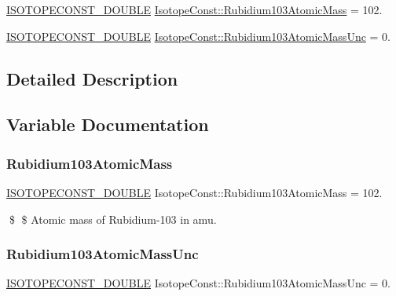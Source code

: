 \begin{DoxyCompactItemize}
\item 
\mbox{\hyperlink{group___isotope_const-_macros_ga8f45a7272ce02c0b4c65c44636ed719a}{I\+S\+O\+T\+O\+P\+E\+C\+O\+N\+S\+T\+\_\+\+D\+O\+U\+B\+LE}} \mbox{\hyperlink{group___isotope_const-_rubidium-_rb103_gae0bac11aa0f8d093a48d11e3522584f3}{Isotope\+Const\+::\+Rubidium103\+Atomic\+Mass}} = 102.
\item 
\mbox{\hyperlink{group___isotope_const-_macros_ga8f45a7272ce02c0b4c65c44636ed719a}{I\+S\+O\+T\+O\+P\+E\+C\+O\+N\+S\+T\+\_\+\+D\+O\+U\+B\+LE}} \mbox{\hyperlink{group___isotope_const-_rubidium-_rb103_ga96df3425521c2b1dcf44f6757ff8c0a2}{Isotope\+Const\+::\+Rubidium103\+Atomic\+Mass\+Unc}} = 0.
\end{DoxyCompactItemize}


\subsection{Detailed Description}


\subsection{Variable Documentation}
\mbox{\label{group___isotope_const-_rubidium-_rb103_gae0bac11aa0f8d093a48d11e3522584f3}} 
\subsubsection{\texorpdfstring{Rubidium103\+Atomic\+Mass}{Rubidium103AtomicMass}}
{\footnotesize\ttfamily \mbox{\hyperlink{group___isotope_const-_macros_ga8f45a7272ce02c0b4c65c44636ed719a}{I\+S\+O\+T\+O\+P\+E\+C\+O\+N\+S\+T\+\_\+\+D\+O\+U\+B\+LE}} Isotope\+Const\+::\+Rubidium103\+Atomic\+Mass = 102.}

\$ \$ Atomic mass of Rubidium-\/103 in amu. \mbox{\label{group___isotope_const-_rubidium-_rb103_ga96df3425521c2b1dcf44f6757ff8c0a2}} 
\subsubsection{\texorpdfstring{Rubidium103\+Atomic\+Mass\+Unc}{Rubidium103AtomicMassUnc}}
{\footnotesize\ttfamily \mbox{\hyperlink{group___isotope_const-_macros_ga8f45a7272ce02c0b4c65c44636ed719a}{I\+S\+O\+T\+O\+P\+E\+C\+O\+N\+S\+T\+\_\+\+D\+O\+U\+B\+LE}} Isotope\+Const\+::\+Rubidium103\+Atomic\+Mass\+Unc = 0.}

